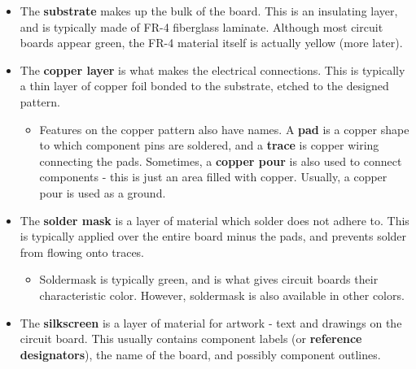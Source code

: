 \documentclass[letterpaper]{article}
\newcommand\liststyleRTFNumxvi{%
\renewcommand\labelitemi{{\textbullet}}
\renewcommand\labelitemii{o}
\renewcommand\labelitemiii{${\blacksquare}$}
\renewcommand\labelitemiv{{\textbullet}}
}
\begin{document}
\liststyleRTFNumxvi
\begin{itemize}
\item {\sffamily\color[rgb]{0.30980393,0.5058824,0.7411765}
The \textbf{substrate} makes up the bulk of the board. This is an insulating layer, and is typically made of FR-4
fiberglass laminate. Although most circuit boards appear green, the FR-4 material itself is actually yellow (more
later).}
\item {\sffamily\color[rgb]{0.30980393,0.5058824,0.7411765}
The \textbf{copper layer} is what makes the electrical connections. This is typically a thin layer of copper foil bonded
to the substrate, etched to the designed pattern.}

\begin{itemize}
\item {\sffamily\color[rgb]{0.30980393,0.5058824,0.7411765}
Features on the copper pattern also have names. A \textbf{pad} is a copper shape to which component pins are soldered,
and a \textbf{trace} is copper {\textquotedbl}wiring{\textquotedbl} connecting the pads. Sometimes, a \textbf{copper
pour} is also used to connect components - this is just an area filled with copper. Usually, a copper pour is used as a
ground.}
\end{itemize}
\item {\sffamily\color[rgb]{0.30980393,0.5058824,0.7411765}
The\textbf{ solder mask} is a layer of material which solder does not adhere to. This is typically applied over the
entire board minus the pads, and prevents solder from flowing onto traces.}

\begin{itemize}
\item {\sffamily\color[rgb]{0.30980393,0.5058824,0.7411765}
Soldermask is typically green, and is what gives circuit boards their characteristic color. However, soldermask is also
available in other colors.}
\end{itemize}
\item {\sffamily\color[rgb]{0.30980393,0.5058824,0.7411765}
The \textbf{silkscreen} is a layer of material for {\textquotedbl}artwork{\textquotedbl} - text and drawings on the
circuit board. This usually contains component labels (or \textbf{reference designators}), the name of the board, and
possibly component outlines.}
\end{itemize}

\bigskip
\end{document}

